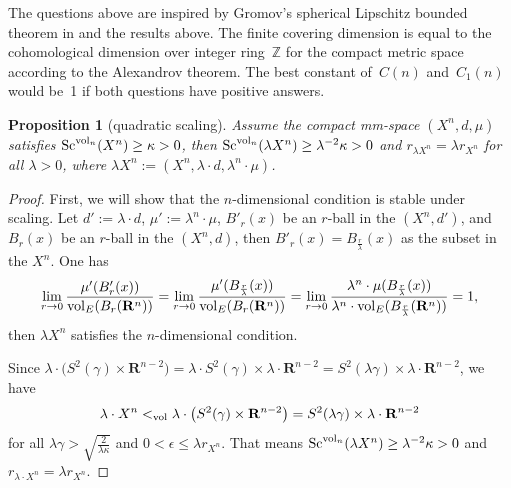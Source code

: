 \documentclass[10pt,a4paper]{amsart}
\newtheorem{Proposition}[Theorem]{Proposition}
\begin{document}
\begin{Remark}
The questions above are inspired by Gromov's spherical Lipschitz bounded theorem in \cite[Section~3]{MR3816521} and the results above. The finite covering dimension is equal to the cohomological dimension over integer ring~$\mathbb{Z}$ for the compact metric space according to the Alexandrov theorem. The best constant of~$C(n)$ and~$C_1(n)$ would be~1 if both questions have positive answers.
\end{Remark}

\begin{Proposition}[quadratic scaling] Assume the compact mm-space $(X^n, d, \mu)$ satisfies \linebreak ${\rm Sc}^{{\rm vol}_n}(X^n)\geq \kappa> 0$, then ${\rm Sc}^{{\rm vol}_n}(\lambda X^n)\geq \lambda ^{-2}\kappa> 0$ and $r_{\lambda X^n}=\lambda r_{X^n}$ for all $\lambda>0$, where $\lambda X^n:=(X^n, \lambda \cdot d,\lambda^n \cdot \mu)$.
 \end{Proposition}

\begin{proof}
 First, we will show that the $n$-dimensional condition is stable under scaling. Let $d':=\lambda\cdot d$, $\mu':=\lambda^n \cdot \mu$, $B'_r(x)$ be an $r$-ball in the $(X^n,d')$, and $B_r(x)$ be an $r$-ball in the $(X^n,d)$, then $B'_r(x)=B_{\frac{r}{\lambda}}(x)$ as the subset in the $X^n$. One has
 \begin{gather*}
 \lim\limits_{r \to 0}\frac{\mu'(B'_r(x))}{{\rm vol}_E(B_r(\mathbf{R}^n))}=\lim\limits_{r \to 0}\frac{\mu'(B_{\frac{r}{\lambda}}(x))}{{\rm vol}_E(B_r(\mathbf{R}^n))}=\lim\limits_{r \to 0}\frac{\lambda^n \cdot \mu(B_{\frac{r}{\lambda}}(x))}{\lambda^n \cdot {\rm vol}_E(B_{\frac{r}{\lambda}}(\mathbf{R}^n))}=1,
\end{gather*}
 then $\lambda X^n$ satisfies the $n$-dimensional condition.

 Since $\lambda \cdot \big(S^2(\gamma)\times \mathbf{R}^{n-2} \big)=\lambda \cdot S^2(\gamma)\times \lambda\cdot\mathbf{R}^{n-2}=S^2(\lambda \gamma)\times \lambda\cdot\mathbf{R}^{n-2}$, we have
 \begin{gather*}
 \lambda \cdot X^n<_{\rm vol}\lambda \cdot \big(S^2(\gamma)\times \mathbf{R}^{n-2} \big)=S^2(\lambda \gamma)\times \lambda\cdot\mathbf{R}^{n-2}
 \end{gather*}
 for all $\lambda\gamma> \sqrt{\frac{2}{\lambda\kappa}}$ and $0 < \epsilon \leq \lambda r_{X^n}$. That means ${\rm Sc}^{{\rm vol}_n}(\lambda X^n)\geq \lambda ^{-2}\kappa> 0$ and $r_{\lambda \cdot X^n}=\lambda r_{X^n}$.
 \end{proof}
\end{document}
